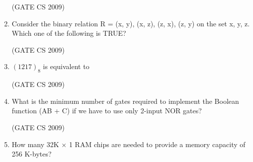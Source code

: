 \documentclass[a4paper, 11pt]{article}
\begin{document}
\begin{enumerate}
    \hfill (GATE CS 2009)

    \item Consider the binary relation R = {(x, y), (x, z), (z, x), (z, y)} on the set {x, y, z}. Which one of the following is TRUE?
    \begin{enumerate}
    \end{enumerate}

    \hfill (GATE CS 2009)

    \item $(1217)_8$ is equivalent to
    \begin{enumerate}
    \end{enumerate}

    \hfill (GATE CS 2009)

    \item What is the minimum number of gates required to implement the Boolean function (AB + C) if we have to use only 2-input NOR gates?
    \begin{enumerate}
    \end{enumerate}

    \hfill (GATE CS 2009)

    \item How many 32K $\times$ 1 RAM chips are needed to provide a memory capacity of 256 K-bytes?\\
    \begin{enumerate}
    \end{enumerate}


\end{enumerate}
\end{document}
